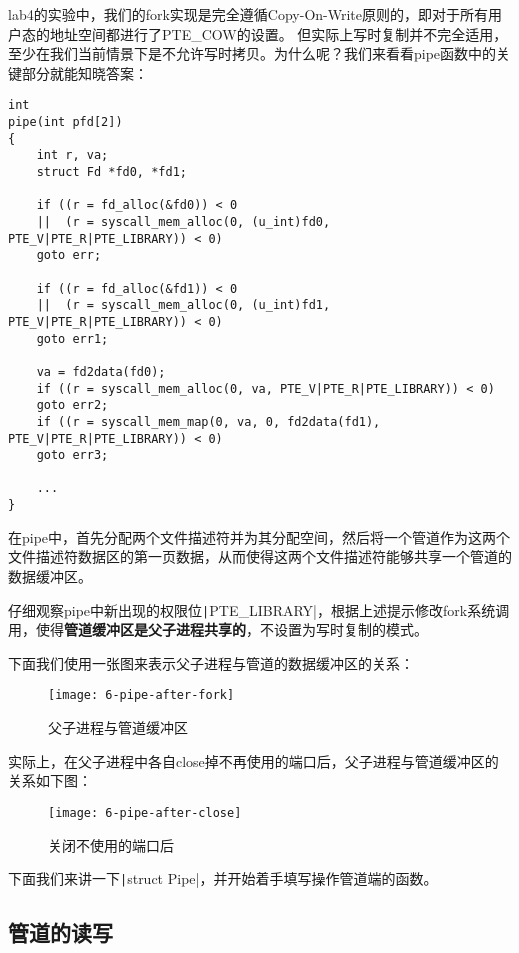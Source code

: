 lab4的实验中，我们的fork实现是完全遵循Copy-On-Write原则的，即对于所有用户态的地址空间都进行了PTE\_COW的设置。
但实际上写时复制并不完全适用，至少在我们当前情景下是不允许写时拷贝。为什么呢？我们来看看pipe函数中的关键部分就能知晓答案：

\begin{verbatim}
int
pipe(int pfd[2])
{
	int r, va;
	struct Fd *fd0, *fd1;
	
	if ((r = fd_alloc(&fd0)) < 0
	||  (r = syscall_mem_alloc(0, (u_int)fd0, PTE_V|PTE_R|PTE_LIBRARY)) < 0)
	goto err;
	
	if ((r = fd_alloc(&fd1)) < 0
	||  (r = syscall_mem_alloc(0, (u_int)fd1, PTE_V|PTE_R|PTE_LIBRARY)) < 0)
	goto err1;
	
	va = fd2data(fd0);
	if ((r = syscall_mem_alloc(0, va, PTE_V|PTE_R|PTE_LIBRARY)) < 0)
	goto err2;
	if ((r = syscall_mem_map(0, va, 0, fd2data(fd1), PTE_V|PTE_R|PTE_LIBRARY)) < 0)
	goto err3;
	
	...
}
\end{verbatim}

在pipe中，首先分配两个文件描述符并为其分配空间，然后将一个管道作为这两个文件描述符数据区的第一页数据，从而使得这两个文件描述符能够共享一个管道的数据缓冲区。

\begin{exercise}
	仔细观察pipe中新出现的权限位\texttt|PTE_LIBRARY|，根据上述提示修改fork系统调用，使得\textbf{管道缓冲区是父子进程共享的}，不设置为写时复制的模式。
\end{exercise}

下面我们使用一张图来表示父子进程与管道的数据缓冲区的关系：

\begin{figure}[htbp]
	\centering
	\texttt{[image: 6-pipe-after-fork]}
	\caption{父子进程与管道缓冲区}\label{fig:6-pipe-after-fork} 
\end{figure}

实际上，在父子进程中各自close掉不再使用的端口后，父子进程与管道缓冲区的关系如下图：

\begin{figure}[htbp]
	\centering
	\texttt{[image: 6-pipe-after-close]}
	\caption{关闭不使用的端口后}\label{fig:6-pipe-after-close} 
\end{figure}

下面我们来讲一下\texttt|struct Pipe|，并开始着手填写操作管道端的函数。

\subsection{管道的读写}

